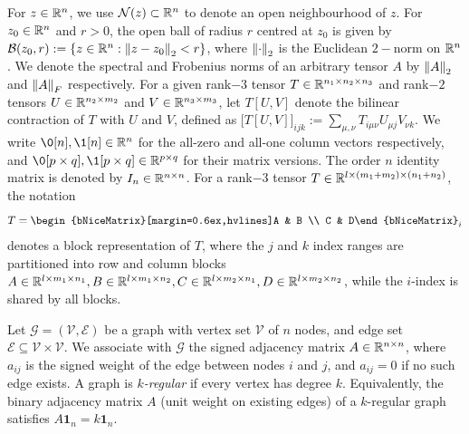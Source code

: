 \documentclass[a4paper]{cas-dc}
\begin{document}

For \(z \in \R[n]\), we use \(\mathcal{N}(z) \subset \R[n]\) to denote an open neighbourhood of \(z\). For \(z_0 \in \R[n]\) and \(r > 0\), the open ball of radius \(r\) centred at \(z_0\) is given by \(\mathcal{B}(z_0,r) := \{z \in \R[n] : \norm{z - z_0}_2 < r\}\), where \(\norm{\cdot}_2\) is the Euclidean \(2-\)norm on \(\R[n]\). We denote the spectral and Frobenius norms of an arbitrary tensor \(A\) by \(\norm{A}_2\) and \(\norm{A}_F\) respectively.
For a given rank\(-3\) tensor \(T \in \R[n_1 \times n_2 \times n_3]\) and rank\(-2\) tensors \(U \in \R[n_2 \times m_2]\) and \(V \in \R[n_3 \times m_3]\), let \(T[U,V]\) denote the bilinear contraction of \(T\) with \(U\) and \(V\), defined as \(\bigl[T[U,V]\bigr]_{ijk}:=\sum_{\mu,\nu}T_{i\mu\nu}U_{\mu j}V_{\nu k}\).
We write \(\0[n], \1[n] \in \R[n]\) for the all-zero and all-one column vectors respectively, and \(\0[p \times q], \1[p \times q] \in \R[p \times q]\) for their matrix versions. The order \(n\) identity matrix is denoted by \(I_n \in \R[n \times n]\). For a rank\(-3\) tensor \(T\in\R[l \times (m_1+m_2) \times (n_1+n_2)]\), the notation
\begin{equation*}
    T = \begin{bNiceMatrix}[margin=0.6ex,hvlines]A & B \\ C & D\end{bNiceMatrix}_{i}
\end{equation*}
denotes a block representation of \(T\), where the \(j\) and \(k\) index ranges are partitioned into row and column blocks \(A\in\R[l \times m_1 \times n_1], B\in\R[l \times m_1 \times n_2], C\in\R[l \times m_2 \times n_1], D\in\R[l \times m_2 \times n_2]\), while the \(i\)-index is shared by all blocks.

Let \(\mathcal{G} = (\mathcal{V}, \mathcal{E})\) be a graph with vertex set \(\mathcal{V}\) of \(n\) nodes, and edge set \(\mathcal{E} \subseteq \mathcal{V} \times \mathcal{V}\). We associate with \(\mathcal{G}\) the signed adjacency matrix \(A \in \R[n \times n]\), where \(a_{ij}\) is the signed weight of the edge between nodes \(i\) and \(j\), and \(a_{ij} = 0\) if no such edge exists. A graph is \emph{\(k\)-regular} if every vertex has degree \(k\). Equivalently, the binary adjacency matrix \(A\) (unit weight on existing edges) of a \(k\)-regular graph satisfies \(A \mathbf{1}_{n} = k \mathbf{1}_{n}\).
\end{document}
